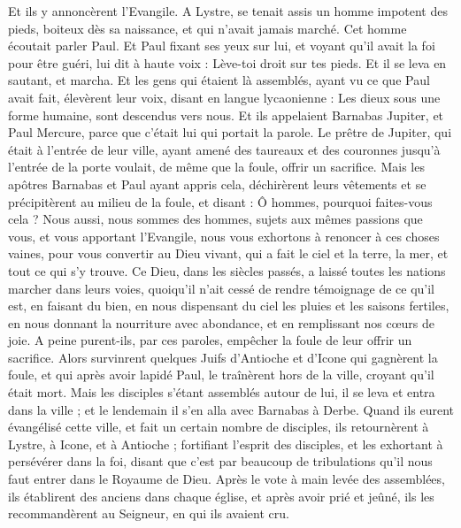 \begin{multicols}{2}
Et ils y annoncèrent l'Evangile.
A Lystre, se tenait assis un homme impotent des pieds, boiteux dès sa naissance, et qui n'avait jamais marché.
Cet homme écoutait parler Paul. Et Paul fixant ses yeux sur lui, et voyant qu'il avait la foi pour être guéri,
lui dit à haute voix : Lève-toi droit sur tes pieds. Et il se leva en sautant, et marcha.
Et les gens qui étaient là assemblés, ayant vu ce que Paul avait fait, élevèrent leur voix, disant en langue lycaonienne : Les dieux sous une forme humaine, sont descendus vers nous.
Et ils appelaient Barnabas Jupiter, et Paul Mercure, parce que c'était lui qui portait la parole.
Le prêtre de Jupiter, qui était à l'entrée de leur ville, ayant amené des taureaux et des couronnes jusqu'à l'entrée de la porte voulait, de même que la foule, offrir un sacrifice.
Mais les apôtres Barnabas et Paul ayant appris cela, déchirèrent leurs vêtements et se précipitèrent au milieu de la foule,
et disant : Ô hommes, pourquoi faites-vous cela ? Nous aussi, nous sommes des hommes, sujets aux mêmes passions que vous, et vous apportant l'Evangile, nous vous exhortons à renoncer à ces choses vaines, pour vous convertir au Dieu vivant, qui a fait le ciel et la terre, la mer, et tout ce qui s'y trouve.
Ce Dieu, dans les siècles passés, a laissé toutes les nations marcher dans leurs voies,
quoiqu'il n'ait cessé de rendre témoignage de ce qu'il est, en faisant du bien, en nous dispensant du ciel les pluies et les saisons fertiles, en nous donnant la nourriture avec abondance, et en remplissant nos cœurs de joie.
A peine purent-ils, par ces paroles, empêcher la foule de leur offrir un sacrifice.
Alors survinrent quelques Juifs d'Antioche et d'Icone qui gagnèrent la foule, et qui après avoir lapidé Paul, le traînèrent hors de la ville, croyant qu'il était mort.
Mais les disciples s'étant assemblés autour de lui, il se leva et entra dans la ville ; et le lendemain il s'en alla avec Barnabas à Derbe.
Quand ils eurent évangélisé cette ville, et fait un certain nombre de disciples, ils retournèrent à Lystre, à Icone, et à Antioche ;
fortifiant l'esprit des disciples, et les exhortant à persévérer dans la foi, disant que c'est par beaucoup de tribulations qu'il nous faut entrer dans le Royaume de Dieu.
Après le vote à main levée des assemblées, ils établirent des anciens dans chaque église, et après avoir prié et jeûné, ils les recommandèrent au Seigneur, en qui ils avaient cru.

\end{multicols}
